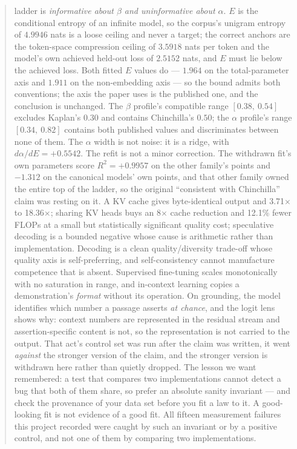 \documentclass[11pt,a4paper]{article}
\begin{document}
\begin{abstract}
ladder is \emph{informative about $\beta$ and uninformative about $\alpha$}.
$E$ is the conditional entropy of an infinite model, so the corpus's unigram
entropy of $4.9946$ nats is a loose ceiling and never a target; the correct
anchors are the token-space compression ceiling of $3.5918$ nats per token and
the model's own achieved held-out loss of $2.5152$ nats, and $E$ must lie
below the achieved loss. Both fitted $E$ values do --- $1.964$ on the
total-parameter axis and $1.911$ on the non-embedding axis --- so the bound
admits both conventions; the axis the paper uses is the published one, and the
conclusion is unchanged. The $\beta$ profile's compatible range
$[0.38,\ 0.54]$ excludes Kaplan's $0.30$ and contains Chinchilla's $0.50$; the
$\alpha$ profile's range $[0.34,\ 0.82]$ contains both published values and
discriminates between none of them. The $\alpha$ width is not noise: it is a
ridge, with $d\alpha/dE = +0.5542$. The refit is not a minor correction.
The withdrawn fit's own parameters score $R^2 = +0.9957$ on the other family's
points and $-1.312$ on the canonical models' own points, and that other family
owned the entire top of the ladder, so the original ``consistent with
Chinchilla'' claim was resting on it. A KV cache gives byte-identical output
and 3.71$\times$ to 18.36$\times$; sharing KV heads buys an 8$\times$ cache
reduction and 12.1\% fewer FLOPs at a small but statistically significant
quality cost; speculative decoding is a bounded negative whose cause is
arithmetic rather than implementation. Decoding is a clean quality/diversity
trade-off whose quality axis is self-preferring, and self-consistency cannot
manufacture competence that is absent. Supervised fine-tuning scales
monotonically with no saturation in range, and in-context learning copies a
demonstration's \emph{format} without its operation. On grounding, the model
identifies which number a passage asserts \emph{at chance}, and the logit lens
shows why: context numbers are represented in the residual stream and
assertion-specific content is not, so the representation is not carried to the
output. That act's control set was run after the claim was written, it went
\emph{against} the stronger version of the claim, and the stronger version is
withdrawn here rather than quietly dropped. The lesson we want remembered: a
test that compares two implementations cannot detect a bug that both of them
share, so prefer an absolute sanity invariant --- and check the provenance of
your data set before you fit a law to it. A good-looking fit is not evidence
of a good fit. All fifteen measurement failures this project recorded were
caught by such an invariant or by a positive control, and not one of them by
comparing two implementations.
\end{abstract}
\end{document}
